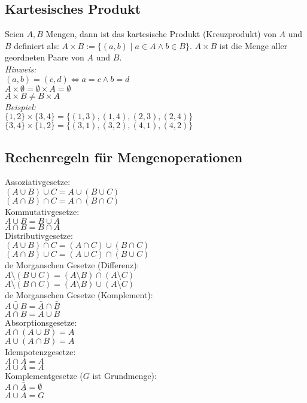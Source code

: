 \subsection*{Kartesisches Produkt}
Seien $A,B$ Mengen, dann ist das kartesische Produkt (Kreuzprodukt)
von $A$ und $B$ definiert als: $A\times B:=\{(a,b)\mid a\in A\wedge b\in B\}$.
$A\times B$ ist die Menge aller geordneten Paare von $A$ und $B$.\\
\emph{Hinweis:}\\
$(a,b)=(c,d)\Leftrightarrow a=c\wedge b=d$\\
$A\times\emptyset=\emptyset\times A=\emptyset$\\
$A\times B\neq B\times A$\\
\emph{Beispiel:}\\
$\{1,2\}\times\{3,4\}=\{(1,3),(1,4),(2,3),(2,4)\}$\\
$\{3,4\}\times\{1,2\}=\{(3,1),(3,2),(4,1),(4,2)\}$
\subsection*{Rechenregeln für Mengenoperationen}
Assoziativgesetze:\\
$(A\cup B)\cup C=A\cup (B\cup C)$\\
$(A\cap B)\cap C=A\cap (B\cap C)$\\
Kommutativgesetze:\\
$A\cup B=B\cup A$\\
$A\cap B=B\cap A$\\
Distributivgesetze:\\
$(A\cup B)\cap C=(A\cap C)\cup (B\cap C)$\\
$(A\cap B)\cup C=(A\cup C)\cap (B\cup C)$\\
de Morganschen Gesetze (Differenz):\\
$A\setminus (B\cup C)=(A\setminus B)\cap (A\setminus C)$\\
$A\setminus (B\cap C)=(A\setminus B)\cup (A\setminus C)$\\
de Morganschen Gesetze (Komplement):\\
$\bar{A\cup B}=\bar{A}\cap\bar{B}$\\
$\bar{A\cap B}=\bar{A}\cup\bar{B}$\\
Absorptionsgesetze:\\
$A\cap (A\cup B)=A$\\
$A\cup (A\cap B)=A$\\
Idempotenzgesetze:\\
$A\cap A=A$\\
$A\cup A=A$\\
Komplementgesetze ($G$ ist Grundmenge):\\
$A\cap\bar{A}=\emptyset$\\
$A\cup\bar{A}=G$